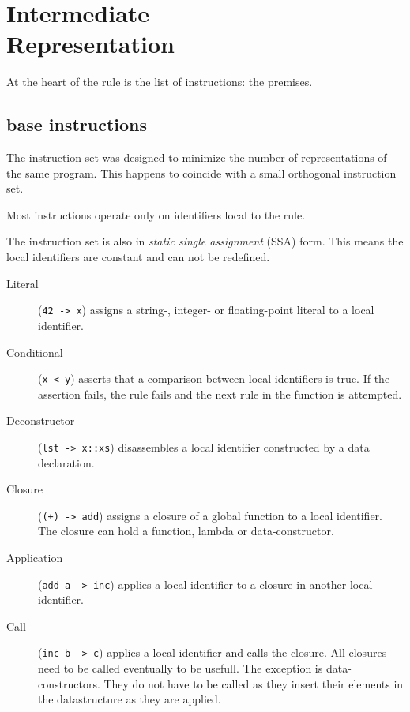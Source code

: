 \section[Intermediate Representation]{Intermediate\\Representation}
At the heart of the rule is the list of instructions: the premises.

\subsection{base instructions}
The instruction set was designed to minimize the number of representations of the same program.
This happens to coincide with a small orthogonal instruction set.


Most instructions operate only on identifiers local to the rule.

The instruction set is also in \textit{static single assignment} (SSA) form.
This means the local identifiers are constant and can not be redefined.

\begin{description}
\item[Literal] (\verb|42 -> x|) assigns a string-, integer- or floating-point literal to a local identifier.
\item[Conditional] (\verb|x < y|) asserts that a comparison between local identifiers is true.
    If the assertion fails, the rule fails and the next rule in the function is attempted.
\item[Deconstructor] (\verb|lst -> x::xs|) disassembles a local identifier constructed by a data declaration.
\item[Closure] (\verb|(+) -> add|) assigns a closure of a global function to a local identifier.
    The closure can hold a function, lambda or data-constructor.
\item[Application] (\verb|add a -> inc|) applies a local identifier to a closure in another local identifier.
\item[Call] (\verb|inc b -> c|) applies a local identifier and calls the closure.
    All closures need to be called eventually to be usefull.
    The exception is data-constructors. 
    They do not have to be called as they insert their elements in the datastructure as they are applied.
\end{description}


